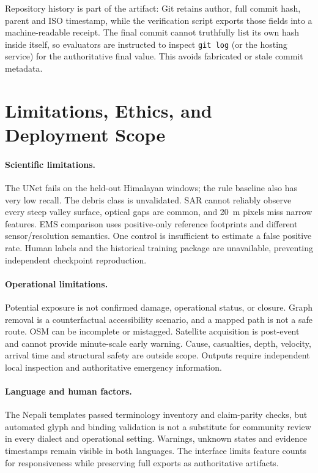 \documentclass[10pt,twocolumn,letterpaper]{article}
\begin{document}
Repository history is part of the artifact: Git retains author, full commit hash,
parent and ISO timestamp, while the verification script exports those fields into
a machine-readable receipt. The final commit cannot truthfully list its own hash
inside itself, so evaluators are instructed to inspect \texttt{git log} (or the
hosting service) for the authoritative final value. This avoids fabricated or
stale commit metadata.

\section{Limitations, Ethics, and Deployment Scope}
\paragraph{Scientific limitations.}
The UNet fails on the held-out Himalayan windows; the rule baseline also has very
low recall. The debris class is unvalidated. SAR cannot reliably observe every
steep valley surface, optical gaps are common, and 20~m pixels miss narrow
features. EMS comparison uses positive-only reference footprints and different
sensor/resolution semantics. One control is insufficient to estimate a false
positive rate. Human labels and the historical training package are unavailable,
preventing independent checkpoint reproduction.

\paragraph{Operational limitations.}
Potential exposure is not confirmed damage, operational status, or closure.
Graph removal is a counterfactual accessibility scenario, and a mapped path is
not a safe route. OSM can be incomplete or mistagged. Satellite acquisition is
post-event and cannot provide minute-scale early warning. Cause, casualties,
depth, velocity, arrival time and structural safety are outside scope. Outputs
require independent local inspection and authoritative emergency information.

\paragraph{Language and human factors.}
The Nepali templates passed terminology inventory and claim-parity checks, but
automated glyph and binding validation is not a substitute for community review
in every dialect and operational setting. Warnings, unknown states and evidence
timestamps remain visible in both languages. The interface limits feature counts
for responsiveness while preserving full exports as authoritative artifacts.
\end{document}
